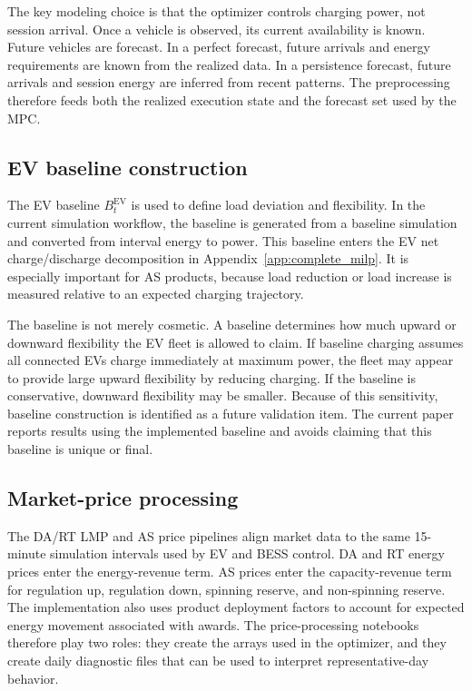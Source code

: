 \documentclass[final,5p,times]{elsarticle}
\newcommand{\EV}{\mathrm{EV}}
\begin{document}
The key modeling choice is that the optimizer controls charging power, not session arrival. Once a vehicle is observed, its current availability is known. Future vehicles are forecast. In a perfect forecast, future arrivals and energy requirements are known from the realized data. In a persistence forecast, future arrivals and session energy are inferred from recent patterns. The preprocessing therefore feeds both the realized execution state and the forecast set used by the MPC.

\subsection{EV baseline construction}
The EV baseline $B_t^{\EV}$ is used to define load deviation and flexibility. In the current simulation workflow, the baseline is generated from a baseline simulation and converted from interval energy to power. This baseline enters the EV net charge/discharge decomposition in Appendix~\ref{app:complete_milp}. It is especially important for AS products, because load reduction or load increase is measured relative to an expected charging trajectory.

The baseline is not merely cosmetic. A baseline determines how much upward or downward flexibility the EV fleet is allowed to claim. If baseline charging assumes all connected EVs charge immediately at maximum power, the fleet may appear to provide large upward flexibility by reducing charging. If the baseline is conservative, downward flexibility may be smaller. Because of this sensitivity, baseline construction is identified as a future validation item. The current paper reports results using the implemented baseline and avoids claiming that this baseline is unique or final.

\subsection{Market-price processing}
The DA/RT LMP and AS price pipelines align market data to the same 15-minute simulation intervals used by EV and BESS control. DA and RT energy prices enter the energy-revenue term. AS prices enter the capacity-revenue term for regulation up, regulation down, spinning reserve, and non-spinning reserve. The implementation also uses product deployment factors to account for expected energy movement associated with awards. The price-processing notebooks therefore play two roles: they create the arrays used in the optimizer, and they create daily diagnostic files that can be used to interpret representative-day behavior.
\end{document}
